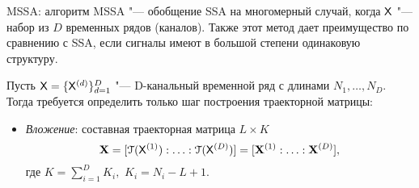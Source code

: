 \documentclass[ucs, notheorems, handout]{beamer}
\begin{document}
\begin{frame}{MSSA: алгоритм}
	MSSA "--- обобщение SSA на многомерный случай, когда $\mathsf{X}$ "--- набор из $D$ временных рядов (каналов). Также этот метод дает преимущество по сравнению с SSA, если сигналы имеют в большой степени одинаковую структуру. \medskip
	
	Пусть $\mathsf{X}=\{\mathsf{X}^{(d)}\}_{d=1}^D$ "--- D-канальный временной ряд с длинами $N_1,\ldots,N_D$. Тогда требуется определить только шаг построения траекторной матрицы:\medskip
	
	\begin{itemize}
		\item \emph{Вложение}: составная траекторная матрица $L\times K$  $$\mathbf{X}=[\EuScript{T}(\mathsf{X}^{(1)}):\ldots:\EuScript{T}(\mathsf{X}^{(D)})]=[\mathbf{X}^{(1)}:\ldots:\mathbf{X}^{(D)}],$$ где $K=\sum_{i=1}^D K_i,$ $K_i=N_i-L+1$.
		
	\end{itemize}
			
\end{frame}
\end{document}
